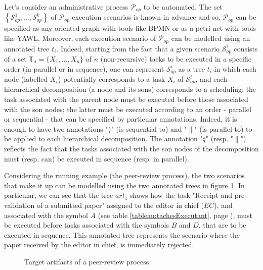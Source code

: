 \label{chap3:sec:modelling-artifacts}

\label{chap3:sec:artifacts-structure}
Let's consider an administrative process $\mathcal{P}_{op}$ to be automated. The set $\left\{ \mathcal{S}_{op}^1,\ldots,\mathcal{S}_{op}^k \right\}$ of $\mathcal{P}_{op}$ execution scenarios is known in advance and so, $\mathcal{P}_{op}$ can be specified as any oriented graph with tools like BPMN or as a petri net with tools like YAWL. 
Moreover, each execution scenario of $\mathcal{P}_{op}$ can be modelled using an annotated tree $t_i$. Indeed, starting from the fact that a given scenario $\mathcal{S}_{op}^i$ consists of a set $\mathbb{T}_n = \{X_1, \ldots, X_n\}$ of $n$ (non-recursive) tasks to be executed in a specific order (in parallel or in sequence), one can represent $\mathcal{S}_{op}^i$ as a tree $t_i$ in which each node (labelled $X_i$) potentially corresponds to a task $X_i$ of $\mathcal{S}_{op}^i$, and each hierarchical decomposition (a node and its sons) corresponds to a scheduling: the task associated with the parent node must be executed before those associated with the son nodes; the latter must be executed according to an order - parallel or sequential - that can be specified by particular annotations. Indeed, it is enough to have two annotations "$\fatsemi$" (is sequential to) and "$\parallel$" (is parallel to) to be applied to each hierarchical decomposition. The annotation "$\fatsemi$" (resp. "$\parallel$") reflects the fact that the tasks associated with the son nodes of the decomposition must (resp. can) be executed in sequence (resp. in parallel).

Considering the running example (the peer-review process), the two scenarios that make it up can be modelled using the two annotated trees in figure \ref{chap3:fig:global-artefacts}. In particular, we can see that the tree $art_1$ shows how the task "Receipt and pre-validation of a submitted paper" assigned to the editor in chief ($EC$), and associated with the symbol $A$ (see table \ref{tableau:tachesExecutant}, page \pageref{tableau:tachesExecutant}), must be executed before tasks associated with the symbols $B$ and $D$, that are to be executed in sequence. This annotated tree represents the scenario where the paper received by the editor in chief, is immediately rejected.
\begin{figure}[ht!]
	\noindent
	\caption{Target artifacts of a peer-review process.}
	\label{chap3:fig:global-artefacts}
\end{figure}


